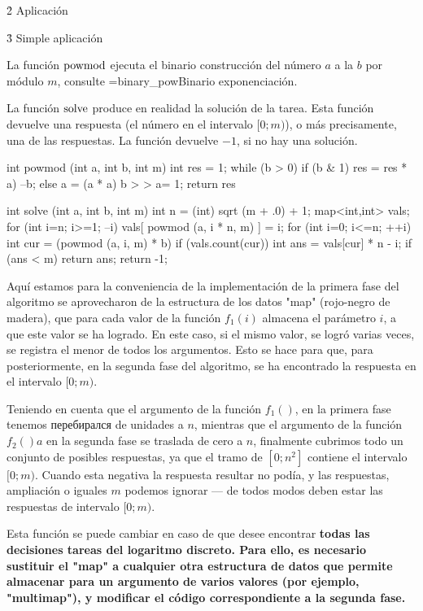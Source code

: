 \h2{ Aplicación }


\h3{ Simple aplicación }

La función $\rm powmod$ ejecuta el binario construcción del número $a$ a la $b$ por módulo $m$, consulte \algohref=binary_pow{Binario exponenciación}.

La función $\rm solve$ produce en realidad la solución de la tarea. Esta función devuelve una respuesta (el número en el intervalo $[0;m)$), o más precisamente, una de las respuestas. La función devuelve $-1$, si no hay una solución.

\code
int powmod (int a, int b, int m) {
int res = 1;
while (b > 0)
if (b & 1) {
res = res * a) %
--b;
}
else {
a = (a * a) %
b > > a= 1;
}
return res %
}

int solve (int a, int b, int m) {
int n = (int) sqrt (m + .0) + 1;
map<int,int> vals;
for (int i=n; i>=1; --i)
vals[ powmod (a, i * n, m) ] = i;
for (int i=0; i<=n; ++i) {
int cur = (powmod (a, i, m) * b) %
if (vals.count(cur)) {
int ans = vals[cur] * n - i;
if (ans < m)
return ans;
}
}
return -1;
}
\endcode

Aquí estamos para la conveniencia de la implementación de la primera fase del algoritmo se aprovecharon de la estructura de los datos "map" (rojo-negro de madera), que para cada valor de la función $f_1(i)$ almacena el parámetro $i$, a que este valor se ha logrado. En este caso, si el mismo valor, se logró varias veces, se registra el menor de todos los argumentos. Esto se hace para que, para posteriormente, en la segunda fase del algoritmo, se ha encontrado la respuesta en el intervalo $[0;m)$.

Teniendo en cuenta que el argumento de la función $f_1 ()$, en la primera fase tenemos перебирался de unidades a $n$, mientras que el argumento de la función $f_2 () a$ en la segunda fase se traslada de cero a $n$, finalmente cubrimos todo un conjunto de posibles respuestas, ya que el tramo de $[0; n^2]$ contiene el intervalo $[0;m)$. Cuando esta negativa la respuesta resultar no podía, y las respuestas, ampliación o iguales $m$ podemos ignorar --- de todos modos deben estar las respuestas de intervalo $[0;m)$.

Esta función se puede cambiar en caso de que desee encontrar \bf{todas las decisiones} tareas del logaritmo discreto. Para ello, es necesario sustituir el "map" a cualquier otra estructura de datos que permite almacenar para un argumento de varios valores (por ejemplo, "multimap"), y modificar el código correspondiente a la segunda fase.


